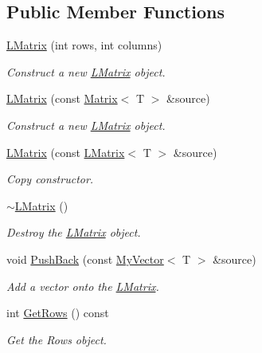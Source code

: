 \subsection*{Public Member Functions}
\begin{DoxyCompactItemize}
\item 
\mbox{\hyperlink{class_l_matrix_a5e031d95fcb4ce79894c52488d224f98}{L\+Matrix}} (int rows, int columns)
\begin{DoxyCompactList}\small\item\em Construct a new \mbox{\hyperlink{class_l_matrix}{L\+Matrix}} object. \end{DoxyCompactList}\item 
\mbox{\hyperlink{class_l_matrix_aa4bc8aa349207a09c467d958d7361b4b}{L\+Matrix}} (const \mbox{\hyperlink{class_matrix}{Matrix}}$<$ T $>$ \&source)
\begin{DoxyCompactList}\small\item\em Construct a new \mbox{\hyperlink{class_l_matrix}{L\+Matrix}} object. \end{DoxyCompactList}\item 
\mbox{\hyperlink{class_l_matrix_a0a4d56623c6c83d9fd2c3040e41429ae}{L\+Matrix}} (const \mbox{\hyperlink{class_l_matrix}{L\+Matrix}}$<$ T $>$ \&source)
\begin{DoxyCompactList}\small\item\em Copy constructor. \end{DoxyCompactList}\item 
\mbox{\hyperlink{class_l_matrix_ab4289f015b6b154b0f396550c1975250}{$\sim$\+L\+Matrix}} ()
\begin{DoxyCompactList}\small\item\em Destroy the \mbox{\hyperlink{class_l_matrix}{L\+Matrix}} object. \end{DoxyCompactList}\item 
void \mbox{\hyperlink{class_l_matrix_a3f82539f6b2251d49a2e39c7c359b92d}{Push\+Back}} (const \mbox{\hyperlink{class_my_vector}{My\+Vector}}$<$ T $>$ \&source)
\begin{DoxyCompactList}\small\item\em Add a vector onto the \mbox{\hyperlink{class_l_matrix}{L\+Matrix}}. \end{DoxyCompactList}\item 
int \mbox{\hyperlink{class_l_matrix_ad4ed9d329dbd01d010504a97b3879442}{Get\+Rows}} () const
\begin{DoxyCompactList}\small\item\em Get the Rows object. \end{DoxyCompactList}\item 

\end{DoxyCompactItemize}
